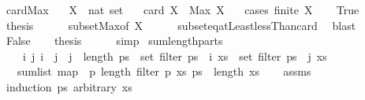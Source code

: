 \begin{isabellebody}
\isanewline
{}\isamarkupfalse%
\ card{\isacharunderscore}Max{\isacharcolon}\isanewline
\ \ \ X\ {\isacharcolon}{\isacharcolon}\ {\isachardoublequoteopen}nat\ set{\isachardoublequoteclose}\isanewline
\ \ \ {\isachardoublequoteopen}card\ X\ {\isasymle}\ Max\ X\ {\isacharplus}\ {}{\isachardoublequoteclose}\isanewline
%
\isadelimproof
%
\endisadelimproof
%
\isatagproof
{}\isamarkupfalse%
\ {\isacharparenleft}cases\ {\isachardoublequoteopen}finite\ X{\isachardoublequoteclose}{\isacharparenright}\isanewline
\ \ \isamarkupfalse%
\ True\isanewline
\ \ \isamarkupfalse%
\ {\isacharquery}thesis\isanewline
\ \ \ \ \isamarkupfalse%
\ subset{\isacharunderscore}Max{\isacharbrackleft}of\ X{\isacharbrackright}\isanewline
\ \ \ \ \isamarkupfalse%
\ subset{\isacharunderscore}eq{\isacharunderscore}atLeast{}{\isacharunderscore}lessThan{\isacharunderscore}card\ \isamarkupfalse%
\ blast\isanewline
{}\isamarkupfalse%
\isanewline
\ \ \isamarkupfalse%
\ False\isanewline
\ \ \isamarkupfalse%
\ {\isacharquery}thesis\isanewline
\ \ \ \ \isamarkupfalse%
\ simp\isanewline
{}\isamarkupfalse%
%
\endisatagproof
{\isafoldproof}%
%
\isadelimproof
\isanewline
%
\endisadelimproof
\isanewline
{}\isamarkupfalse%
\ sum{\isacharunderscore}length{\isacharunderscore}parts{\isacharcolon}\isanewline
\ \ \ {\isachardoublequoteopen}{\isasymforall}\ i\ j{\isachardot}\ i\ {\isacharless}\ j\ {\isasymand}\ j\ {\isacharless}\ length\ ps\ {\isasymlongrightarrow}\ set\ {\isacharparenleft}filter\ {\isacharparenleft}ps\ {\isacharbang}\ i{\isacharparenright}\ xs{\isacharparenright}\ {\isasyminter}\ set\ {\isacharparenleft}filter\ {\isacharparenleft}ps\ {\isacharbang}\ j{\isacharparenright}\ xs{\isacharparenright}\ {\isacharequal}\ {\isacharbraceleft}{\isacharbraceright}{\isachardoublequoteclose}\isanewline
\ \ \ {\isachardoublequoteopen}sum{\isacharunderscore}list\ {\isacharparenleft}map\ {\isacharparenleft}{\isasymlambda}\ p{\isachardot}\ length\ {\isacharparenleft}filter\ p\ xs{\isacharparenright}{\isacharparenright}\ ps{\isacharparenright}\ {\isasymle}\ length\ xs{\isachardoublequoteclose}\isanewline
%
\isadelimproof
\ \ %
\endisadelimproof
%
\isatagproof
{}\isamarkupfalse%
\ assms\isanewline
{}\isamarkupfalse%
\ {\isacharparenleft}induction\ ps\ arbitrary{\isacharcolon}\ xs{\isacharparenright}\isanewline

\end{isabellebody}
